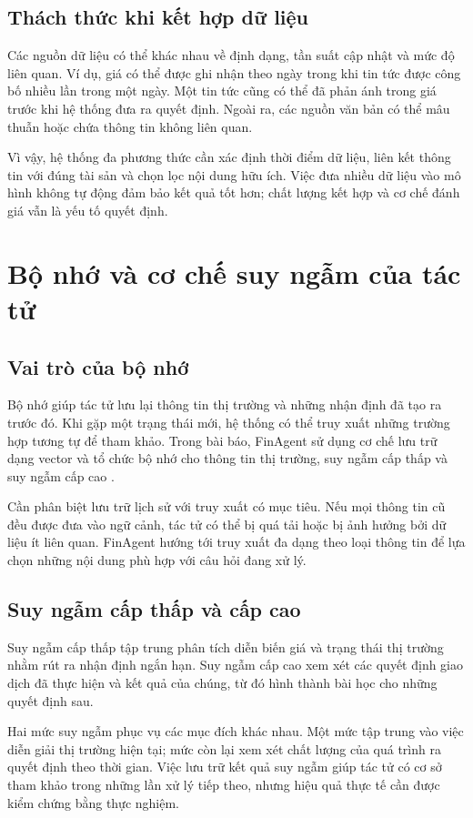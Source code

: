\subsection{Thách thức khi kết hợp dữ liệu}
Các nguồn dữ liệu có thể khác nhau về định dạng, tần suất cập nhật và mức độ liên quan. Ví dụ, giá có thể được ghi nhận theo ngày trong khi tin tức được công bố nhiều lần trong một ngày. Một tin tức cũng có thể đã phản ánh trong giá trước khi hệ thống đưa ra quyết định. Ngoài ra, các nguồn văn bản có thể mâu thuẫn hoặc chứa thông tin không liên quan.

Vì vậy, hệ thống đa phương thức cần xác định thời điểm dữ liệu, liên kết thông tin với đúng tài sản và chọn lọc nội dung hữu ích. Việc đưa nhiều dữ liệu vào mô hình không tự động đảm bảo kết quả tốt hơn; chất lượng kết hợp và cơ chế đánh giá vẫn là yếu tố quyết định.

\section{Bộ nhớ và cơ chế suy ngẫm của tác tử}

\subsection{Vai trò của bộ nhớ}
Bộ nhớ giúp tác tử lưu lại thông tin thị trường và những nhận định đã tạo ra trước đó. Khi gặp một trạng thái mới, hệ thống có thể truy xuất những trường hợp tương tự để tham khảo. Trong bài báo, FinAgent sử dụng cơ chế lưu trữ dạng vector và tổ chức bộ nhớ cho thông tin thị trường, suy ngẫm cấp thấp và suy ngẫm cấp cao \cite{zhang2024finagent}.

Cần phân biệt lưu trữ lịch sử với truy xuất có mục tiêu. Nếu mọi thông tin cũ đều được đưa vào ngữ cảnh, tác tử có thể bị quá tải hoặc bị ảnh hưởng bởi dữ liệu ít liên quan. FinAgent hướng tới truy xuất đa dạng theo loại thông tin để lựa chọn những nội dung phù hợp với câu hỏi đang xử lý.

\subsection{Suy ngẫm cấp thấp và cấp cao}
Suy ngẫm cấp thấp tập trung phân tích diễn biến giá và trạng thái thị trường nhằm rút ra nhận định ngắn hạn. Suy ngẫm cấp cao xem xét các quyết định giao dịch đã thực hiện và kết quả của chúng, từ đó hình thành bài học cho những quyết định sau.

Hai mức suy ngẫm phục vụ các mục đích khác nhau. Một mức tập trung vào việc diễn giải thị trường hiện tại; mức còn lại xem xét chất lượng của quá trình ra quyết định theo thời gian. Việc lưu trữ kết quả suy ngẫm giúp tác tử có cơ sở tham khảo trong những lần xử lý tiếp theo, nhưng hiệu quả thực tế cần được kiểm chứng bằng thực nghiệm.


